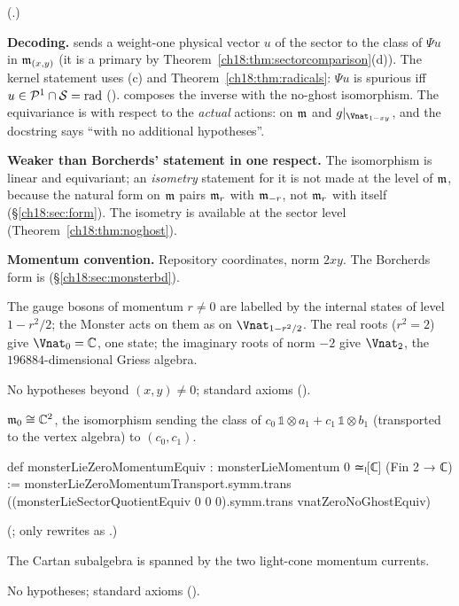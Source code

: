 (.)
\begin{dictionary}
\textbf{Decoding.}   sends a weight-one physical vector $u$ of the
sector to the class of $\Psi u$ in $\mathfrak{m}_{(x,y)}$ (it is a primary by Theorem~\ref{ch18:thm:sectorcomparison}(d)).
The kernel statement uses (c) and Theorem~\ref{ch18:thm:radicals}: $\Psi u$ is spurious iff $u\in\mathcal{P}^1\cap\mathcal{S}=\mathrm{rad}$
().   composes the inverse with the no-ghost
isomorphism.  The equivariance is with respect to the \emph{actual} actions:  on $\mathfrak{m}$
and $g|_{\Vnat_{1-xy}}$, and the docstring says ``with no additional hypotheses''.

\textbf{Weaker than Borcherds' statement in one respect.}  The isomorphism is linear and equivariant; an
\emph{isometry} statement for it is not made at the level of $\mathfrak{m}$, because the natural form on $\mathfrak{m}$ pairs
$\mathfrak{m}_r$ with $\mathfrak{m}_{-r}$, not $\mathfrak{m}_r$ with itself (\S\ref{ch18:sec:form}).  The isometry is available at the
sector level (Theorem~\ref{ch18:thm:noghost}).

\textbf{Momentum convention.}  Repository coordinates, norm $2xy$.  The Borcherds form is
 (\S\ref{ch18:sec:monsterbd}).
\end{dictionary}
\begin{physics}
The gauge bosons of momentum $r\neq0$ are labelled by the internal states of level $1-r^2/2$; the Monster
acts on them as on $\Vnat_{1-r^2/2}$.  The real roots ($r^2=2$) give $\Vnat_0=\mathbb C$, one state; the
imaginary roots of norm $-2$ give $\Vnat_2$, the $196884$-dimensional Griess algebra.
\end{physics}
\begin{status}No hypotheses beyond $(x,y)\neq0$; standard axioms ().\end{status}

\begin{theorem}\label{ch18:thm:zerospace}
$\mathfrak{m}_0\cong\mathbb C^2$, the isomorphism sending the class of $c_0\,\mathbb 1\otimes a_1+c_1\,\mathbb 1\otimes b_1$ (transported to
the vertex algebra) to $(c_0,c_1)$.
\end{theorem}
\begin{leancode}
def monsterLieZeroMomentumEquiv : monsterLieMomentum 0 ≃ₗ[ℂ] (Fin 2 → ℂ) :=
  monsterLieZeroMomentumTransport.symm.trans
    ((monsterLieSectorQuotientEquiv 0 0 0).symm.trans vnatZeroNoGhostEquiv)
\end{leancode}
(;  only rewrites
\lean{![0, 0]} as .)
\begin{physics}The Cartan subalgebra is spanned by the two light-cone momentum currents.\end{physics}
\begin{status}No hypotheses; standard axioms ().\end{status}

